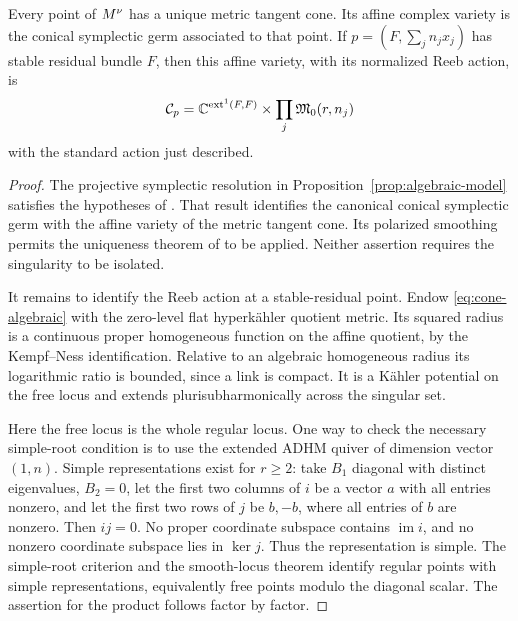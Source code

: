 \begin{theorem}\label{thm:cones}
Every point of $M^{\nu}$ has a unique metric tangent cone. Its affine complex
variety is the conical symplectic germ associated to that point.
If $p=(F,\sum_jn_jx_j)$ has stable residual bundle $F$, then this affine
variety, with its normalized Reeb action, is
\begin{equation}\label{eq:cone-algebraic}
 \mathcal C_p=\mathbb C^{\operatorname{ext}^1(F,F)}
                    \times\prod_j\mathfrak M_0(r,n_j)
\end{equation}
with the standard action just described.
\end{theorem}
\begin{proof}
The projective symplectic resolution in
Proposition~\ref{prop:algebraic-model} satisfies the hypotheses of
\cite[Theorems~1.1 and 6.1]{NO26}. That result identifies the canonical
conical symplectic germ with the affine variety of the metric tangent
cone. Its polarized smoothing permits the uniqueness theorem of
\cite[Theorem~1.3]{DS17} to be applied. Neither assertion requires the
singularity to be isolated.

It remains to identify the Reeb action at a stable-residual point.
Endow \eqref{eq:cone-algebraic} with the zero-level flat hyperk\"ahler
quotient metric. Its squared radius is a continuous proper homogeneous
function on the affine quotient, by the Kempf--Ness identification.
Relative to an algebraic homogeneous radius its logarithmic ratio is
bounded, since a link is compact. It is a K\"ahler potential on the free
locus and extends plurisubharmonically across the singular set.

Here the free locus is the whole regular locus. One way to check the
necessary simple-root condition is to use the extended ADHM quiver of
dimension vector $(1,n)$. Simple representations exist for $r\ge2$:
take $B_1$ diagonal with distinct eigenvalues, $B_2=0$, let the first two
columns of $i$ be a vector $a$ with all entries nonzero, and let the first
two rows of $j$ be $b,-b$, where all entries of $b$ are nonzero.
Then $ij=0$. No proper coordinate subspace contains $\operatorname{im}i$,
and no nonzero coordinate subspace lies in $\ker j$.
Thus the representation is simple. The simple-root criterion
\cite[Theorem~1.2]{CB01} and the smooth-locus theorem
\cite[Theorem~1.15]{BSc23} identify regular points with simple
representations, equivalently free points modulo the diagonal scalar.
The assertion for the product follows factor by factor.


\end{proof}
